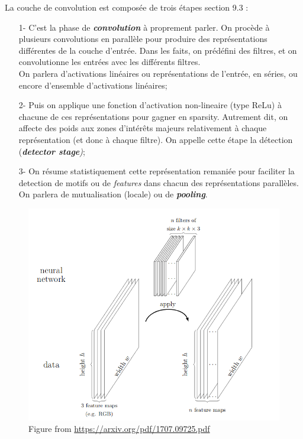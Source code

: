 \documentclass[a4paper,12pt]{report}
\numberwithin{equation}{section} %
\begin{document}
La couche de convolution est composée de trois étapes \citep{Goodfellow-et-al-2016} section 9.3 :
\begin{itemize}[leftmargin=1cm]
	\item[1-] C'est la phase de \textit{\textbf{convolution}} à proprement parler. On procède à plusieurs convolutions en parallèle pour produire des représentations différentes de la couche d'entrée. Dans les faits, on prédéfini des filtres, et on convolutionne les entrées avec les différents filtres. \\ On parlera d'activations linéaires ou représentations de l'entrée, en séries, ou encore d'ensemble d'activations linéaires;
	\item[2-] Puis on applique une fonction d'activation non-lineaire (type ReLu) à chacune de ces représentations pour gagner en sparsity. Autrement dit, on affecte des poids aux zones d'intérêts majeurs relativement à chaque représentation (et donc à chaque filtre). On appelle cette étape la détection (\textit{\textbf{detector stage})};
	\item[3-] On résume statistiquement cette représentation remaniée pour faciliter la detection de motifs ou de \textit{features} dans chacun des représentations parallèles. On parlera de mutualisation (locale) ou de \textit{\textbf{pooling}}.
\end{itemize}

\begin{figure}[!ht]
\centering
\includegraphics[scale=0.455]{feature_maps.png}
\captionsetup{labelformat=empty}
\caption{Figure from \url{https://arxiv.org/pdf/1707.09725.pdf}}
\end{figure}
\end{document}
